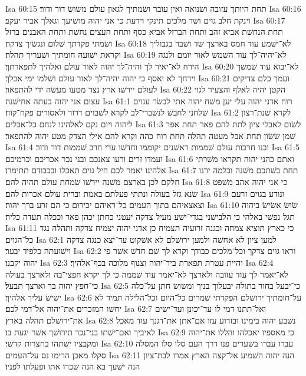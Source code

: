 Isa 60:15  תחת היותך עזובה ושׂנואה ואין עובר ושׂמתיך לגאון עולם משׂושׂ דור ודור׃
Isa 60:16  וינקת חלב גוים ושׁד מלכים תינקי וידעת כי אני יהוה מושׁיעך וגאלך אביר יעקב׃
Isa 60:17  תחת הנחשׁת אביא זהב ותחת הברזל אביא כסף ותחת העצים נחשׁת ותחת האבנים ברזל ושׂמתי פקדתך שׁלום ונגשׂיך צדקה׃
Isa 60:18  לא־ישׁמע עוד חמס בארצך שׁד ושׁבר בגבוליך וקראת ישׁועה חומתיך ושׁעריך תהלה׃
Isa 60:19  לא־יהיה־לך עוד השׁמשׁ לאור יומם ולנגה הירח לא־יאיר לך והיה־לך יהוה לאור עולם ואלהיך לתפארתך׃
Isa 60:20  לא־יבוא עוד שׁמשׁך וירחך לא יאסף כי יהוה יהיה־לך לאור עולם ושׁלמו ימי אבלך׃
Isa 60:21  ועמך כלם צדיקים לעולם יירשׁו ארץ נצר מטעו מעשׂה ידי להתפאר׃
Isa 60:22  הקטן יהיה לאלף והצעיר לגוי עצום אני יהוה בעתה אחישׁנה׃
Isa 61:1  רוח אדני יהוה עלי יען משׁח יהוה אתי לבשׂר ענוים שׁלחני לחבשׁ לנשׁברי־לב לקרא לשׁבוים דרור ולאסורים פקח־קוח׃
Isa 61:2  לקרא שׁנת־רצון ליהוה ויום נקם לאלהינו לנחם כל־אבלים׃
Isa 61:3  לשׂום לאבלי ציון לתת להם פאר תחת אפר שׁמן שׂשׂון תחת אבל מעטה תהלה תחת רוח כהה וקרא להם אילי הצדק מטע יהוה להתפאר׃
Isa 61:4  ובנו חרבות עולם שׁממות ראשׁנים יקוממו וחדשׁו ערי חרב שׁממות דור ודור׃
Isa 61:5  ועמדו זרים ורעו צאנכם ובני נכר אכריכם וכרמיכם׃
Isa 61:6  ואתם כהני יהוה תקראו משׁרתי אלהינו יאמר לכם חיל גוים תאכלו ובכבודם תתימרו׃
Isa 61:7  תחת בשׁתכם משׁנה וכלמה ירנו חלקם לכן בארצם משׁנה יירשׁו שׂמחת עולם תהיה להם׃
Isa 61:8  כי אני יהוה אהב משׁפט שׂנא גזל בעולה ונתתי פעלתם באמת וברית עולם אכרות להם׃
Isa 61:9  ונודע בגוים זרעם וצאצאיהם בתוך העמים כל־ראיהם יכירום כי הם זרע ברך יהוה׃
Isa 61:10  שׂושׂ אשׂישׂ ביהוה תגל נפשׁי באלהי כי הלבישׁני בגדי־ישׁע מעיל צדקה יעטני כחתן יכהן פאר וככלה תעדה כליה׃
Isa 61:11  כי כארץ תוציא צמחה וכגנה זרועיה תצמיח כן אדני יהוה יצמיח צדקה ותהלה נגד כל־הגוים׃
Isa 62:1  למען ציון לא אחשׁה ולמען ירושׁלם לא אשׁקוט עד־יצא כנגה צדקה וישׁועתה כלפיד יבער׃
Isa 62:2  וראו גוים צדקך וכל־מלכים כבודך וקרא לך שׁם חדשׁ אשׁר פי יהוה יקבנו׃
Isa 62:3  והיית עטרת תפארת ביד־יהוה וצנוף מלוכה בכף־אלהיך׃
Isa 62:4  לא־יאמר לך עוד עזובה ולארצך לא־יאמר עוד שׁממה כי לך יקרא חפצי־בה ולארצך בעולה כי־חפץ יהוה בך וארצך תבעל׃
Isa 62:5  כי־יבעל בחור בתולה יבעלוך בניך ומשׂושׂ חתן על־כלה ישׂישׂ עליך אלהיך׃
Isa 62:6  על־חומתיך ירושׁלם הפקדתי שׁמרים כל־היום וכל־הלילה תמיד לא יחשׁו המזכרים את־יהוה אל־דמי לכם׃
Isa 62:7  ואל־תתנו דמי לו עד־יכונן ועד־ישׂים את־ירושׁלם תהלה בארץ׃
Isa 62:8  נשׁבע יהוה בימינו ובזרוע עזו אם־אתן את־דגנך עוד מאכל לאיביך ואם־ישׁתו בני־נכר תירושׁך אשׁר יגעת בו׃
Isa 62:9  כי מאספיו יאכלהו והללו את־יהוה ומקבציו ישׁתהו בחצרות קדשׁי׃
Isa 62:10  עברו עברו בשׁערים פנו דרך העם סלו סלו המסלה סקלו מאבן הרימו נס על־העמים׃
Isa 62:11  הנה יהוה השׁמיע אל־קצה הארץ אמרו לבת־ציון הנה ישׁעך בא הנה שׂכרו אתו ופעלתו לפניו׃
